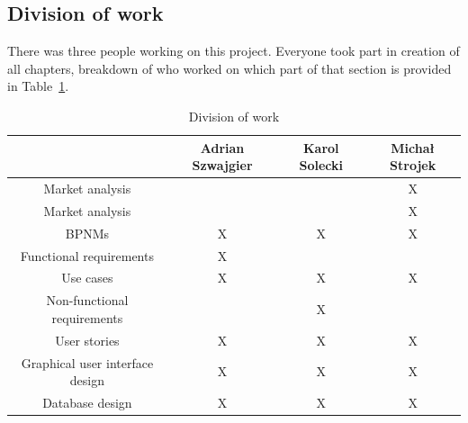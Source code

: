 \subsection{Division of work}
There was three people working on this project. Everyone took part in creation of all chapters, breakdown of who worked on which part of that section is provided in Table~\ref{tab:divison_of_work}.
\FloatBarrier
\begin{longtable}{|c|c|c|c|}
	\caption{Division of work}
	\label{tab:divison_of_work}\\[-1.5ex]
	\hline
	                                & Adrian Szwajgier & Karol Solecki & Michał Strojek \\ \hline
Market analysis                 &                  &               & X              \\ \hline
Market analysis                 &                  &               & X              \\ \hline
BPNMs                           & X                & X             & X              \\ \hline
Functional requirements         & X                &               &                \\ \hline
Use cases                       & X                & X             & X              \\ \hline
Non-functional requirements     &                  & X             &                \\ \hline
User stories                    & X                & X             & X              \\ \hline
Graphical user interface design & X                & X             & X              \\ \hline
Database design                 & X                & X             & X              \\ \hline
\end{longtable}
\FloatBarrier
